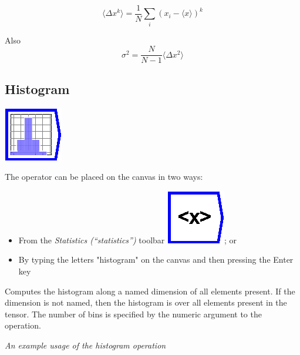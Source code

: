\[
\langle\Delta x^{k}\rangle=\frac{1}{N}\sum_{i}(x_{i}-\langle x\rangle)^{k}
\]

Also 
\[
\sigma^{2}=\frac{N}{N-1}\langle\Delta x^{2}\rangle
\]


\subsection{Histogram}

\label{Operation:histogram}

\includegraphics{images/histogram}

The operator can be placed on the canvas in two ways:
\begin{itemize}
\item From the \emph{Statistics (``statistics'')} toolbar \includegraphics{images/mean};
or 
\item By typing the letters "histogram" on the canvas and then pressing
the Enter key
\end{itemize}
Computes the histogram along a named dimension of all elements present.
If the dimension is not named, then the histogram is over all elements
present in the tensor. The number of bins is specified by the numeric
argument to the operation.
\begin{center}
\par\end{center}

\begin{center}
{\em An example usage of the histogram operation} 
\par\end{center}

